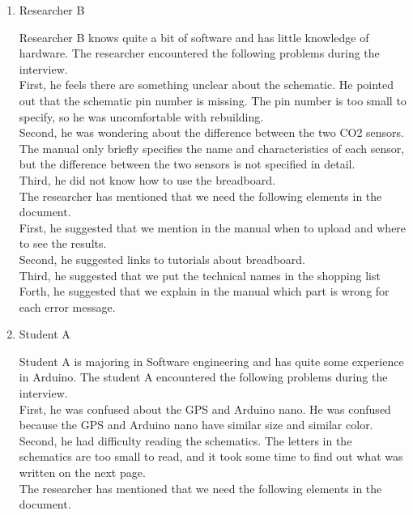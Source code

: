 \documentclass[conference]{IEEEtran}
\begin{document}
\begin{enumerate}
\begin{enumerate}
\item Researcher B

Researcher B knows quite a bit of software and has little knowledge of hardware. The researcher encountered the following problems during the interview.\\

		First, he feels there are something unclear about the schematic. He pointed out that the schematic pin number is missing. The pin number is too small to specify, so he was uncomfortable with rebuilding.\\
		Second, he was wondering about the difference between the two CO2 sensors. The manual only briefly specifies the name and characteristics of each sensor, but the difference between the two sensors is not specified in detail.\\
		Third, he did not know how to use the breadboard.\\

The researcher has mentioned that we need the following elements in the document.\\

		First, he suggested that we mention in the manual when to upload and where to see the results. \\
		Second, he suggested links to tutorials about breadboard.\\
		Third, he suggested that we put the technical names in the shopping list\\
		Forth, he suggested that we explain in the manual which part is wrong for each error message.\\

\item Student A

Student A is majoring in Software engineering and has  quite some experience in Arduino. The student A encountered the following problems during the interview.\\

		First, he was confused about the GPS and Arduino nano. He was confused because the GPS and Arduino nano have similar size and similar color.\\
		Second, he had difficulty reading the schematics. The letters in the schematics are too small to read, and it took some time to find out what was written on the next page.\\

The researcher has mentioned that we need the following elements in the document.\\


\end{enumerate}
\end{enumerate}
\end{document}
